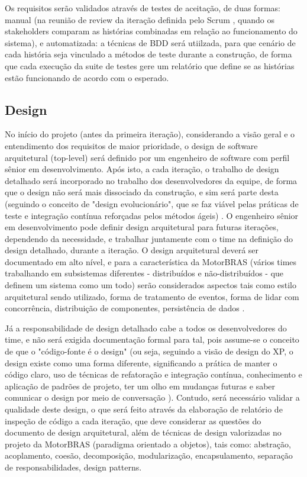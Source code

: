 \documentclass[12pt,journal,compsoc]{IEEEtran}
\begin{document}
Os requisitos serão validados através de testes de aceitação, de duas formas: manual (na reunião de review da iteração definida pelo Scrum \cite{scrum_development_process}, quando os stakeholders comparam as histórias combinadas em relação ao funcionamento do sistema), e automatizada: a técnicas de BDD \cite{chelimsky2010rspec} será utiilzada, para que cenário de cada história seja vinculado a métodos de teste durante a construção, de forma que cada execução da suite de testes gere um relatório que define se as histórias estão funcionando de acordo com o esperado.

\subsection{Design}

No início do projeto (antes da primeira iteração), considerando a visão geral e o entendimento dos requisitos de maior prioridade, o design de software arquitetural (top-level) \cite{society_software_2004} será definido por um %
engenheiro de software com perfil sênior em desenvolvimento. Após isto, a cada iteração, o trabalho de design detalhado será incorporado no trabalho dos desenvolvedores da equipe, de forma que o design não será mais dissociado da construção, e sim será parte desta (seguindo o conceito de "design evolucionário", que se faz viável pelas práticas de teste e integração contínua reforçadas pelos métodos ágeis) \cite{fowler_planned_evolutionary_design}. O engenheiro sênior em desenvolvimento pode definir design arquitetural para futuras iterações, dependendo da necessidade, e trabalhar juntamente com o time na definição do design detalhado, durante a iteração. O design arquitetural deverá ser documentado em alto nível, e para a característica da MotorBRAS (vários times trabalhando em subsistemas diferentes - distribuídos e não-distribuídos - que definem um sistema como um todo) serão considerados aspectos tais como estilo arquitetural sendo utilizado, forma de tratamento de eventos, forma de lidar com concorrência, distribuição de componentes, persistência de dados \cite{society_software_2004}.

Já a responsabilidade de design detalhado cabe a todos os desenvolvedores do time, e não será exigida documentação formal para tal, pois assume-se o conceito de que o "código-fonte é o design" (ou seja, seguindo a visão de design do XP, o design existe como uma forma diferente, significando a prática de manter o código claro, uso de técnicas de refatoração e integração contínua, conhecimento e aplicação de padrões de projeto, ter um olho em mudanças futuras e saber comunicar o design por meio de conversação \cite{fowler_design_dead}). Contudo, será necessário validar a qualidade deste design, o que será feito através da elaboração de relatório de inspeção de código a cada iteração, que deve considerar as questões do documento de design arquitetural, além de técnicas de design valorizadas no projeto da MotorBRAS (paradigma orientado a objetos), tais como: abstração, acoplamento, coesão, decomposição, modularização, encapsulamento, separação de responsabilidades, design patterns. 
\end{document}

